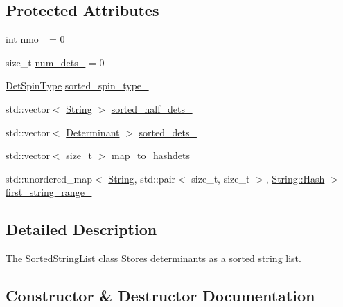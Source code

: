 \subsection*{Protected Attributes}
\begin{DoxyCompactItemize}
\item 
int \mbox{\hyperlink{classforte_1_1_sorted_string_list_a00efebc667b95be7d65dbc530a434c0c}{nmo\+\_\+}} = 0
\item 
size\+\_\+t \mbox{\hyperlink{classforte_1_1_sorted_string_list_a52a84938f4d6cfb53eb15710b4142b22}{num\+\_\+dets\+\_\+}} = 0
\item 
\mbox{\hyperlink{namespaceforte_acb88fa63430aae4a1b15c7be9c55f179}{Det\+Spin\+Type}} \mbox{\hyperlink{classforte_1_1_sorted_string_list_ab11048510565a3459df8a6f570cd2730}{sorted\+\_\+spin\+\_\+type\+\_\+}}
\item 
std\+::vector$<$ \mbox{\hyperlink{namespaceforte_a840d1bfd3a8b3c16e09979212f37313f}{String}} $>$ \mbox{\hyperlink{classforte_1_1_sorted_string_list_ae1f10c54a9d0c1489c69cb6bbe8fe523}{sorted\+\_\+half\+\_\+dets\+\_\+}}
\item 
std\+::vector$<$ \mbox{\hyperlink{namespaceforte_a2076c63fd7b8732004d9e1442ce527c1}{Determinant}} $>$ \mbox{\hyperlink{classforte_1_1_sorted_string_list_acfb13ef7139f239b4bd89cab095e80f1}{sorted\+\_\+dets\+\_\+}}
\item 
std\+::vector$<$ size\+\_\+t $>$ \mbox{\hyperlink{classforte_1_1_sorted_string_list_a78300c31035372e1441d831cb781748c}{map\+\_\+to\+\_\+hashdets\+\_\+}}
\item 
std\+::unordered\+\_\+map$<$ \mbox{\hyperlink{namespaceforte_a840d1bfd3a8b3c16e09979212f37313f}{String}}, std\+::pair$<$ size\+\_\+t, size\+\_\+t $>$, \mbox{\hyperlink{structforte_1_1_bit_array_1_1_hash}{String\+::\+Hash}} $>$ \mbox{\hyperlink{classforte_1_1_sorted_string_list_a80a397646c5dc964afc2bc4bf22580a7}{first\+\_\+string\+\_\+range\+\_\+}}
\end{DoxyCompactItemize}


\subsection{Detailed Description}
The \mbox{\hyperlink{classforte_1_1_sorted_string_list}{Sorted\+String\+List}} class Stores determinants as a sorted string list. 

\subsection{Constructor \& Destructor Documentation}
\mbox{\label{classforte_1_1_sorted_string_list_aa6c7deb1dcd49cc0cb868ec81bb66a80}} 
